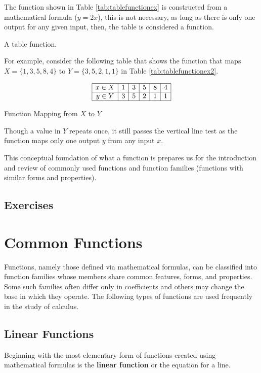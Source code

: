 The function shown in Table \ref{tab:tablefunctionex} is constructed from a mathematical formula ($y = 2x$), this is not necessary, as long as there is only one output for any given input, then, the table is considered a function.

\begin{example} A table function.

    For example, consider the following table that shows the function that maps $X = \{1,3,5,8,4\}$ to $Y = \{3,5,2,1,1\}$ in Table \ref{tab:tablefunctionex2}.
    \begin{table}[!ht]
        \centering
        \[
            \begin{array}{|*{6}{c|}}
                \hline
                x \in X & 1 & 3 & 5 & 8 & 4 \\
                \hline
                y \in Y & 3 & 5 & 2 & 1 & 1 \\
                \hline
            \end{array}
        \]
        \caption{Function Mapping from \( X \) to \( Y \)}
        \label{tab:tablefunctionex2}
    \end{table}
    Though a value in $Y$ repeats once, it still passes the vertical line test as the function maps only one output $y$ from any input $x$.
\end{example}

This conceptual foundation of what a  function is prepares us for the introduction and review of commonly used functions and function families (functions with similar forms and properties).

\subsection*{Exercises}

\section{Common Functions}
\label{sect:common functions}
Functions, namely those defined via mathematical formulas, can be classified into function families whose members share common features, forms, and properties. Some such families often differ only in coefficients and others may change the base in which they operate. The following types of functions are used frequently in the study of calculus.

\subsection{Linear Functions}
Beginning with the most elementary form of functions created using mathematical formulas is the \textbf{linear function} or the equation for a line.

